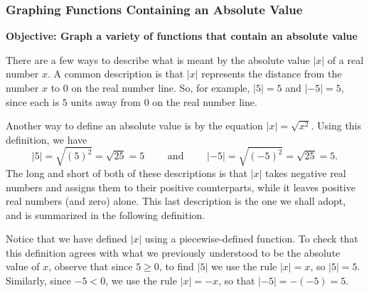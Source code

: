 \documentclass[12pt]{book}
\theoremstyle{definition}
\begin{document}
\subsubsection{Graphing Functions Containing an Absolute Value}
{\bf Objective: Graph a variety of functions that contain an absolute value}\par
There are a few ways to describe what is meant by the absolute value $|x|$ of a real number $x$.  A common description is that $|x|$ represents the distance from the number $x$ to $0$ on the real number line.  So, for example, $|5| = 5$ and $|-5| = 5$, since each is $5$ units away from $0$ on the real number line.
\begin{center}
\end{center}
Another way to define an absolute value is by the equation $|x| = \sqrt{x^2}$. Using this definition, we have 
$$|5| = \sqrt{(5)^2} = \sqrt{25} = 5\qquad\text{~and~}\qquad|-5| = \sqrt{(-5)^2} = \sqrt{25} = 5.$$
The long and short of both of these descriptions is that $|x|$ takes negative real numbers and assigns them to their positive counterparts, while it leaves positive real numbers (and zero) alone.  This last description is the one we shall adopt, and is summarized in the following definition.
\begin{center}
\end{center}
Notice that we have defined $|x|$ using a piecewise-defined function.  To check that this definition agrees with what we previously understood to be the absolute value of $x$, observe that since $5 \geq 0$, to find $|5|$ we use the rule $|x| = x$, so $|5|=5$.  Similarly, since $-5 < 0$, we use the rule $|x| = -x$, so that $|-5| = -(-5) = 5$.\par
\end{document}
